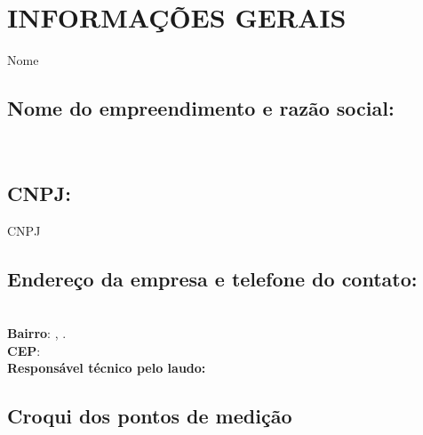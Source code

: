 \chapter{INFORMAÇÕES GERAIS}

Nome

\section{Nome do empreendimento e razão social:} \nomeEmpresa \\
\section{CNPJ:} CNPJ \\
\section{Endereço da empresa e telefone do contato:} \endEmpresa \\
\textbf{Bairro}: \bairro, \cidadeSituada. \\
\textbf{CEP}: \CEP \\
\textbf{Responsável técnico pelo laudo:} \responsavelTecnico \\

\section{Croqui dos pontos de medição} \\
 \\

